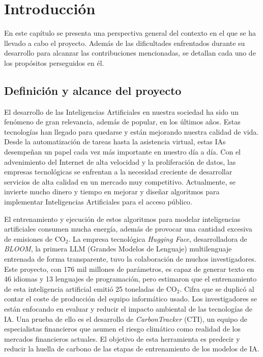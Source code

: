 \chapter{Introducción}

En este capítulo se presenta una perspectiva general del contexto en el que se ha llevado a cabo el proyecto. Además de las dificultades enfrentados durante su desarrollo para alcanzar las contribuciones mencionadas, se detallan cada uno de los propósitos perseguidos en él.


\section{Definición y alcance del proyecto}

	El desarrollo de las Inteligencias Artificiales en nuestra sociedad ha sido un fenómeno de gran relevancia, además de popular, en los últimos años. Estas tecnologías han llegado para quedarse y están mejorando nuestra calidad de vida. Desde la automatización de tareas hasta la asistencia virtual\cite{lugano2017virtual}, estas IAs desempeñan un papel cada vez más importante en nuestro día a día.
	Con el advenimiento del Internet de alta velocidad y la proliferación de datos, las empresas tecnológicas se enfrentan a la necesidad creciente de desarrollar servicios de alta calidad en un mercado muy competitivo. Actualmente, se invierte mucho dinero y tiempo en mejorar y diseñar algoritmos para implementar Inteligencias Artificiales para el acceso público\cite{thomas2021global}.
	
	El entrenamiento y ejecución de estos algoritmos para modelar inteligencias artificiales consumen mucha energía, además de provocar una cantidad excesiva de emisiones de CO\(_2\). La empresa tecnológica \textit{Hugging Face}, desarrolladora de \textit{BLOOM}\cite{BloomAI}, la primera LLM (Grandes Modelos de Lenguaje) multilenguaje entrenada de forma transparente, tuvo la colaboración de muchos investigadores. Este proyecto, con 176 mil millones de parámetros, es capaz de generar texto en 46 idiomas y 13 lenguajes de programación, pero estimaron que el entrenamiento de esta inteligencia artificial emitió 25 toneladas de CO\(_2\). Cifra que se duplicó al contar el coste de producción del equipo informático usado\cite{kirkpatrick2023carbon}. Los investigadores se están enfocando en evaluar y reducir el impacto ambiental de las tecnologías de IA. Una prueba de ello es el desarrollo de \textit{CarbonTracker}\cite{jeppesen2021carbon} (CTI), un equipo de especialistas financieros que asumen el riesgo climático como realidad de los mercados financieros actuales. El objetivo de esta herramienta es predecir y reducir la huella de carbono de las etapas de entrenamiento de los modelos de IA\cite{mor2021artificial}.
	
